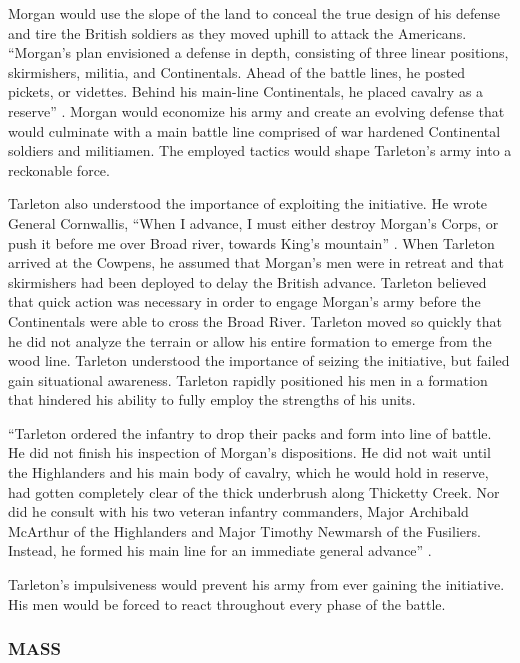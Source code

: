 Morgan would use the slope of the land to conceal the true design of his
defense and tire the British soldiers as they moved uphill to attack the
Americans.  “Morgan’s plan envisioned a defense in depth, consisting of three
linear positions, skirmishers, militia, and Continentals.  Ahead of the battle
lines, he posted pickets, or videttes.  Behind his main-line Continentals, he
placed cavalry as a reserve” \cite[p.72]{babits_devil_2001}.  Morgan would economize his army
and create an evolving defense that would culminate with a main battle line
comprised of war hardened Continental soldiers and militiamen.    The employed
tactics would shape Tarleton’s army into a reckonable force.

Tarleton also understood the importance of exploiting the initiative.  He wrote
General Cornwallis, “When I advance, I must either destroy Morgan’s Corps, or
push it before me over Broad river, towards King’s mountain”
\cite[p.49]{babits_devil_2001}.
When Tarleton arrived at the Cowpens, he assumed that Morgan’s men were in
retreat and that skirmishers had been deployed to delay the British advance.
Tarleton believed that quick action was necessary in order to engage Morgan’s
army before the Continentals were able to cross the Broad River.  Tarleton
moved so quickly that he did not analyze the terrain or allow his entire
formation to emerge from the wood line.  Tarleton understood the importance of
seizing the initiative, but failed gain situational awareness.  Tarleton
rapidly positioned his men in a formation that hindered his ability to fully
employ the strengths of his units.  

“Tarleton ordered the infantry to drop their packs and form into line of
battle.  He did not finish his inspection of Morgan’s dispositions.  He did not
wait until the Highlanders and his main body of cavalry, which he would hold in
reserve, had gotten completely clear of the thick underbrush along Thicketty
Creek.  Nor did he consult with his two veteran infantry commanders, Major
Archibald McArthur of the Highlanders and Major Timothy Newmarsh of the
Fusiliers.  Instead, he formed his main line for an immediate general advance”
\cite[p.321]{buchanan_road_1997}.  

Tarleton’s impulsiveness would prevent his army from ever gaining the
initiative.  His men would be forced to react throughout every phase of the
battle. 

\subsubsection{MASS}

